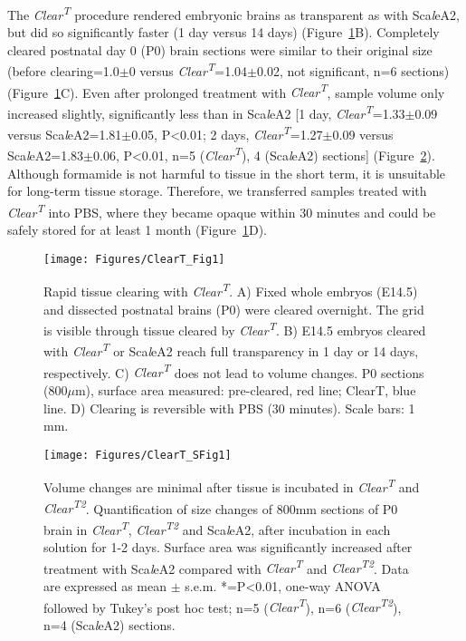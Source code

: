 The \emph{Clear\textsuperscript{T}} procedure rendered embryonic brains as transparent as with Sca\emph{l}eA2, but did so significantly faster (1 day versus 14 days) (Figure~\ref{ClearTFig1}B).
Completely cleared postnatal day 0 (P0) brain sections were similar to their original size (before clearing=1.0$\pm$0 versus \emph{Clear\textsuperscript{T}}=1.04$\pm$0.02, not significant, n=6 sections) (Figure~\ref{ClearTFig1}C).
Even after prolonged treatment with \emph{Clear\textsuperscript{T}}, sample volume only increased slightly, significantly less than in Sca\emph{l}eA2 [1 day, \emph{Clear\textsuperscript{T}}=1.33$\pm$0.09 versus Sca\emph{l}eA2=1.81$\pm$0.05, P<0.01; 2 days, \emph{Clear\textsuperscript{T}}=1.27$\pm$0.09 versus Sca\emph{l}eA2=1.83$\pm$0.06, P<0.01, n=5 (\emph{Clear\textsuperscript{T}}), 4 (Sca\emph{l}eA2) sections] (Figure~\ref{ClearTSFig1}).
Although formamide is not harmful to tissue in the short term, it is unsuitable for long-term tissue storage.
Therefore, we transferred samples treated with \emph{Clear\textsuperscript{T}} into PBS, where they became opaque within 30 minutes and could be safely stored for at least 1 month (Figure~\ref{ClearTFig1}D).

\begin{figure}[hbtp]
\begin{center}
\texttt{[image: Figures/ClearT\_Fig1]}
\caption[Rapid tissue clearing with \emph{Clear\textsuperscript{T}}.]
{Rapid tissue clearing with \emph{Clear\textsuperscript{T}}.
A) Fixed whole embryos (E14.5) and dissected postnatal brains (P0) were cleared overnight.
The grid is visible through tissue cleared by \emph{Clear\textsuperscript{T}}.
B) E14.5 embryos cleared with \emph{Clear\textsuperscript{T}} or Sca\emph{l}eA2 reach full transparency in 1 day or 14 days,
respectively.
C) \emph{Clear\textsuperscript{T}} does not lead to volume changes.
P0 sections (800$\mu$m), surface area measured: pre-cleared, red line; ClearT, blue line.
D) Clearing is reversible with PBS (30 minutes).
Scale bars: 1 mm.
}
\label{ClearTFig1}
\end{center}
\end{figure}

\begin{figure}[hbtp]
\begin{center}
\texttt{[image: Figures/ClearT\_SFig1]}
\caption[Volume changes are minimal after tissue is incubated in \emph{Clear\textsuperscript{T}} and \emph{Clear\textsuperscript{T2}}.]
{Volume changes are minimal after tissue is incubated in \emph{Clear\textsuperscript{T}} and \emph{Clear\textsuperscript{T2}}.
Quantification of size changes of 800mm sections of P0 brain in \emph{Clear\textsuperscript{T}}, \emph{Clear\textsuperscript{T2}} and Sca\emph{l}eA2, after incubation in each solution for 1-2 days.
Surface area was significantly increased after treatment with Sca\emph{l}eA2 compared with \emph{Clear\textsuperscript{T}} and \emph{Clear\textsuperscript{T2}}.
Data are expressed as mean $\pm$ s.e.m.
*=P<0.01, one-way ANOVA followed by Tukey’s post hoc test; n=5 (\emph{Clear\textsuperscript{T}}), n=6 (\emph{Clear\textsuperscript{T2}}), n=4 (Sca\emph{l}eA2) sections.
}
\label{ClearTSFig1}
\end{center}
\end{figure}
